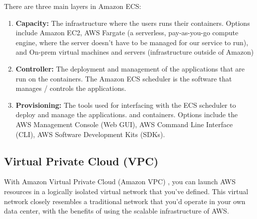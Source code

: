 		There are three main layers in Amazon ECS:
		\begin{enumerate}
			\item \textbf{Capacity:} The infrastructure where the users runs their containers. Options include Amazon EC2, 
			AWS Fargate (a serverless, pay-as-you-go compute engine, where the server doesn't have to be managed for our service to run),
			and On-prem virtual machines and servers (infrastructure outside of Amazon) 
			\item \textbf{Controller:} The deployment and management of the applications that are run on the containers. The Amazon
			ECS scheduler is the software that manages / controls the applications.
			\item \textbf{Provisioning:} The tools used for interfacing with the ECS scheduler to deploy and manage the applications.
			and containers. Options include the AWS Management Console (Web GUI), AWS Command Line Interface (CLI), 
			AWS Software Development Kits (SDKs).
		\end{enumerate}

	\subsection{Virtual Private Cloud (VPC)}
		With Amazon Virtual Private Cloud (Amazon VPC) \cite{vpc}, you can launch AWS resources in a logically 
		isolated virtual network that you've defined. This virtual network closely resembles a traditional network 
		that you'd operate in your own data center, with the benefits of using the scalable infrastructure of AWS.

